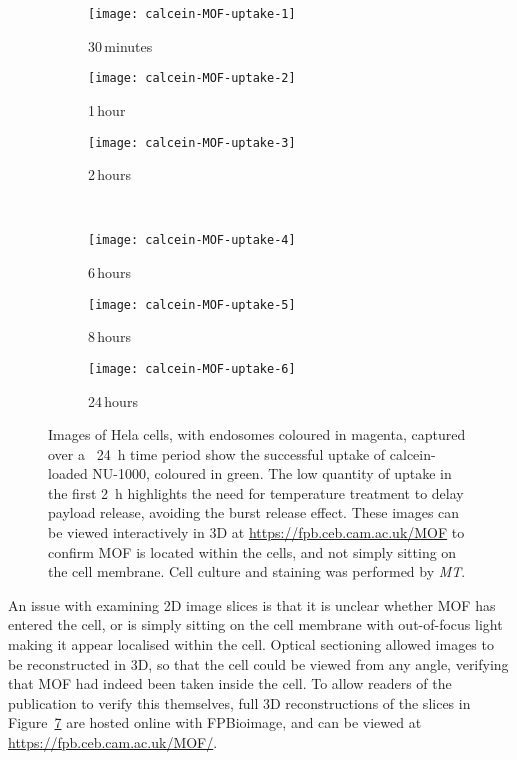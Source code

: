 \begin{figure}[tbp]
\centering
\begin{subfigure}[b]{0.325\textwidth}
	\texttt{[image: calcein-MOF-uptake-1]}
	\caption{30\,minutes}\label{fig:calcein-MOF-uptake-1}
\end{subfigure}
\hfill
\begin{subfigure}[b]{0.325\textwidth}
	\texttt{[image: calcein-MOF-uptake-2]}
	\caption{1\,hour}\label{fig:calcein-MOF-uptake-2}
\end{subfigure}
\hfill
\begin{subfigure}[b]{0.325\textwidth}
	\texttt{[image: calcein-MOF-uptake-3]}
	\caption{2\,hours}\label{fig:calcein-MOF-uptake-3}
\end{subfigure}

~\newline
\begin{subfigure}[b]{0.325\textwidth}
	\texttt{[image: calcein-MOF-uptake-4]}
	\caption{6\,hours}\label{fig:calcein-MOF-uptake-4}
\end{subfigure}
\hfill
\begin{subfigure}[b]{0.325\textwidth}
	\texttt{[image: calcein-MOF-uptake-5]}
	\caption{8\,hours}\label{fig:calcein-MOF-uptake-5}
\end{subfigure}
\hfill
\begin{subfigure}[b]{0.325\textwidth}
	\texttt{[image: calcein-MOF-uptake-6]}
	\caption{24\,hours}\label{fig:calcein-MOF-uptake-6}
\end{subfigure}
\caption[MOFs: Calcein-loaded NU-1000 is taken up by cells over a \SI{24}{\hour} period]{Images of Hela cells, with endosomes coloured in magenta, captured over a ~\SI{24}{\hour} time period show the successful uptake of calcein-loaded NU-1000, coloured in green. The low quantity of uptake in the first \SI{2}{\hour} highlights the need for temperature treatment to delay payload release, avoiding the burst release effect. These images can be viewed interactively in 3D at \url{https://fpb.ceb.cam.ac.uk/MOF} to confirm MOF is located within the cells, and not simply sitting on the cell membrane. Cell culture and staining was performed by \textit{MT}. }
\label{fig:calcein-MOF-uptake}
\end{figure}

An issue with examining 2D image slices is that it is unclear whether MOF has entered the cell, or is simply sitting on the cell membrane with out-of-focus light making it appear localised within the cell.
Optical sectioning allowed images to be reconstructed in 3D, so that the cell could be viewed from any angle, verifying that MOF had indeed been taken inside the cell.
To allow readers of the publication to verify this themselves, full 3D reconstructions of the slices in Figure~\ref{fig:calcein-MOF-uptake} are hosted online with FPBioimage, and can be viewed at \url{https://fpb.ceb.cam.ac.uk/MOF/}.


